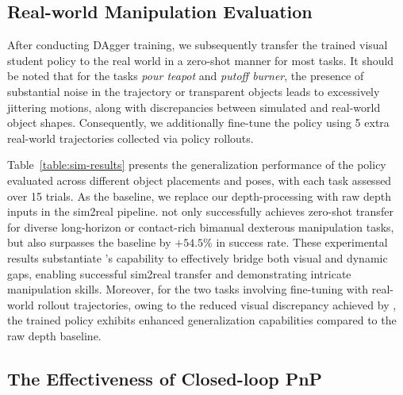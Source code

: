 



\subsection{Real-world Manipulation Evaluation}

After conducting DAgger training, we subsequently transfer the trained visual student policy to the real world in a zero-shot manner for most tasks. It should be noted that for the tasks \textit{pour teapot} and \textit{putoff burner}, the presence of substantial noise in the trajectory or transparent objects leads to excessively jittering motions, along with discrepancies between simulated and real-world object shapes. Consequently,  we additionally fine-tune the policy using 5 extra real-world trajectories collected via policy rollouts. 

Table~\ref{table:sim-results} presents the generalization performance of the policy evaluated across different object placements and poses, with each task assessed over 15 trials. As the baseline, we replace our depth-processing with raw depth inputs in the sim2real pipeline. \ourshort not only successfully achieves zero-shot transfer for diverse long-horizon or contact-rich bimanual dexterous manipulation tasks, but also surpasses the baseline by $\mathbf{+54.5}$\% in success rate. These experimental results substantiate \ourshort's capability to effectively bridge both visual and dynamic gaps, enabling successful sim2real transfer and demonstrating intricate manipulation skills. Moreover, for the two tasks involving fine-tuning with real-world rollout trajectories, owing to the reduced visual discrepancy achieved by \ourshort, the trained policy exhibits enhanced generalization capabilities compared to the raw depth baseline. 


\subsection{The Effectiveness of Closed-loop PnP}

